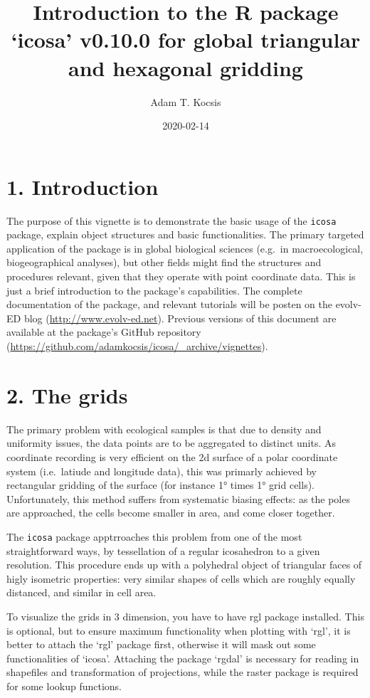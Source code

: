 \documentclass[]{article}
\title{Introduction to the R package `icosa' v0.10.0 for global triangular and
hexagonal gridding}
\author{Adam T. Kocsis}
\date{2020-02-14}
\begin{document}
\maketitle

\section{1. Introduction}\label{introduction}

The purpose of this vignette is to demonstrate the basic usage of the
\texttt{icosa} package, explain object structures and basic
functionalities. The primary targeted application of the package is in
global biological sciences (e.g.~in macroecological, biogeographical
analyses), but other fields might find the structures and procedures
relevant, given that they operate with point coordinate data. This is
just a brief introduction to the package's capabilities. The complete
documentation of the package, and relevant tutorials will be posten on
the evolv-ED blog (\url{http://www.evolv-ed.net}). Previous versions of
this document are available at the package's GitHub repository
(\url{https://github.com/adamkocsis/icosa/_archive/vignettes}).

\section{2. The grids}\label{the-grids}

The primary problem with ecological samples is that due to density and
uniformity issues, the data points are to be aggregated to distinct
units. As coordinate recording is very efficient on the 2d surface of a
polar coordinate system (i.e.~latiude and longitude data), this was
primarly achieved by rectangular gridding of the surface (for instance
1° times 1° grid cells). Unfortunately, this method suffers from
systematic biasing effects: as the poles are approached, the cells
become smaller in area, and come closer together.

The \texttt{icosa} package apptrroaches this problem from one of the
most straightforward ways, by tessellation of a regular icosahedron to a
given resolution. This procedure ends up with a polyhedral object of
triangular faces of higly isometric properties: very similar shapes of
cells which are roughly equally distanced, and similar in cell area.

To visualize the grids in 3 dimension, you have to have rgl package
installed. This is optional, but to ensure maximum functionality when
plotting with `rgl', it is better to attach the `rgl' package first,
otherwise it will mask out some functionalities of `icosa'. Attaching
the package `rgdal' is necessary for reading in shapefiles and
transformation of projections, while the raster package is required for
some lookup functions.
\end{document}
